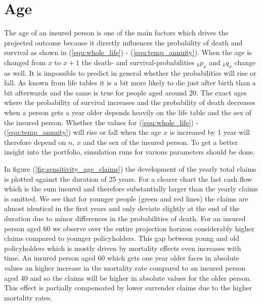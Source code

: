 \section{Age}
\label{sec:age} 
The age of an insured person is one of the main factors which drives the projected outcome because it directly influences the probability of death and survival as shown in (\ref{equ:whole_life}) - (\ref{equ:temp_annuity}). When the age is changed from $x$ to $x+1$ the death- and survival-probabilities ${}_{k}p_x$ and ${}_{k}q_x$ change as well. It is impossible to predict in general whether the probabilities will rise or fall. As known from life tables it is a bit more likely to die just after birth than a bit afterwards and the same is true for people aged around 20. The exact ages where the probability of survival increases and the probability of death decreases when a person gets a year older depends heavily on the life table and the sex of the insured person. Whether the values for (\ref{equ:whole_life}) - (\ref{equ:temp_annuity}) will rise or fall when the age $x$ is increased by 1 year will therefore depend on $n$, $x$ and the sex of the insured person. To get a better insight into the portfolio, simulation runs for various parameters should be done. 

In figure (\ref{fig:sensitivity_age_claims}) the development of the yearly total claims is plotted against the duration of 25 years. For a clearer chart the last cash flow which is the sum insured and therefore substantially larger than the yearly claims is omitted. We see that for younger people (green and red lines) the claims are almost identical in the first years and only deviate slightly at the end of the duration due to minor differences in the probabilities of death. For an insured person aged 60 we observe over the entire projection horizon considerably higher claims compared to younger policyholders. This gap between young and old policyholders which is mostly driven by mortality effects even increases with time. An insured person aged 60 which gets one year older faces in absolute values an higher increase in the mortality rate compared to an insured person aged 40 and so the claims will be higher in absolute values for the older person. This effect is partially compensated by lower surrender claims due to the higher mortality rates.

